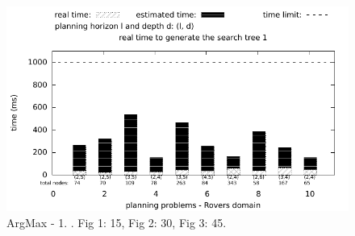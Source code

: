 \documentclass[10pt,a4paper,onecolumn]{article}
\begin{document}
\begin{figure}[hbt]
\begin{center}
\begin{changemargin}{-5.3cm}{1cm}
			\includegraphics[totalheight=8cm]{LESS_ACTIONS_MORE_DEPTH_T1-3/45/MEDIANTIME-LESS_ACTIONS_MORE_DEPTH-T1-45.pdf} 
		\end{changemargin}
		\caption{ArgMax - 1. . Fig 1: 15, Fig 2: 30, Fig 3: 45.}
	\end{center}
	\label{fig:dots3-2}
\end{figure}
\end{document}
